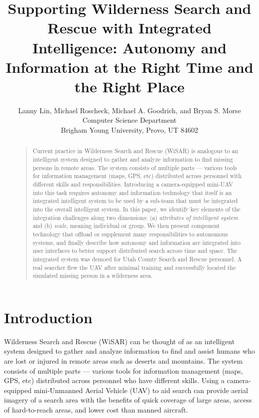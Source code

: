 \documentclass[letterpaper]{article}
\begin{document}
\title{Supporting Wilderness Search and Rescue with Integrated Intelligence: Autonomy and Information at the Right Time and the Right Place}
\author{
Lanny Lin, Michael Roscheck, Michael A. Goodrich, and Bryan S. Morse\\
Computer Science Department \\ 
Brigham Young University, Provo, UT 84602
}
\maketitle



\begin{abstract}
\begin{quote}
Current practice in Wilderness Search and Rescue (WiSAR) is analogous to an intelligent system designed to gather and analyze information to find missing persons in remote areas. The system consists of multiple parts --- various tools for information management (maps, GPS, etc) distributed across personnel with different skills and responsibilities. Introducing a camera-equipped mini-UAV into this task requires autonomy and information technology that itself is an integrated intelligent system to be used by a sub-team that must be integrated into the overall intelligent system. In this paper, we identify key elements of the integration challenges along two dimensions: (a) \textit{attributes of intelligent system} and (b) \textit{scale}, meaning individual or group. We then present component technology that offload or supplement many responsibilities to autonomous systems, and finally describe how autonomy and information are integrated into user interfaces to better support distributed search across time and space. The integrated system was demoed for Utah County Search and Rescue personnel. A real searcher flew the UAV after minimal training and successfully located the simulated missing person in a wilderness area.
\end{quote}
\end{abstract}


\section{Introduction}
Wilderness Search and Rescue (WiSAR) can be thought of as an intelligent system designed to gather and analyze information to find and assist humans who are lost or injured in remote areas such as deserts and mountains. The system consists of multiple parts --- various tools for information management (maps, GPS, etc) distributed across personnel who have different skills. Using a camera-equipped mini-Unmanned Aerial Vehicle (UAV) to aid search can provide aerial imagery of a search area with the benefits of quick coverage of large areas, access of hard-to-reach areas, and lower cost than manned aircraft. 
\end{document}
